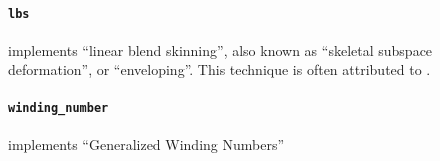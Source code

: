 \documentclass[12pt]{diary}
\begin{document}
\paragraph{\texttt{lbs}} implements ``linear blend skinning'', also known as
``skeletal subspace deformation'', or ``enveloping''. This technique is often
attributed to \cite{Magnenat-Thalmann:1988:JLD}.

\paragraph{\texttt{winding\_number}} implements ``Generalized Winding Numbers''
\cite{Jacobson:WN:2013}


 
\end{document}
